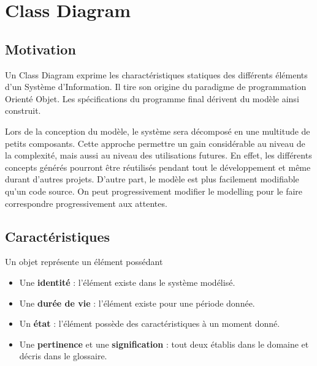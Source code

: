 \chapter{Class Diagram}

\section{Motivation}

Un Class Diagram exprime les charactéristiques statiques des différents éléments d'un Système d'Information. Il tire son origine du paradigme de programmation Orienté Objet. Les spécifications du programme final dérivent du modèle ainsi construit.

Lors de la conception du modèle, le système sera décomposé en une multitude de petits composants. Cette approche permettre un gain considérable au niveau de la complexité, mais aussi au niveau des utilisations futures. En effet, les différents concepts générés pourront être réutilisés pendant tout le développement et même durant d'autres projets. D'autre part, le modèle est plus facilement modifiable qu'un code source. On peut progressivement modifier le modelling pour le faire correspondre progressivement aux attentes.

\section{Caractéristiques}

Un objet représente un élément possédant

\begin{itemize}
  \item Une \textbf{identité} : l'élément existe dans le système modélisé.
  \item Une \textbf{durée de vie} : l'élément existe pour une période donnée.
  \item Un \textbf{état} : l'élément possède des caractéristiques à un moment donné.
  \item Une \textbf{pertinence} et une \textbf{signification} : tout deux établis dans le domaine et décris dans le glossaire.
\end{itemize}
